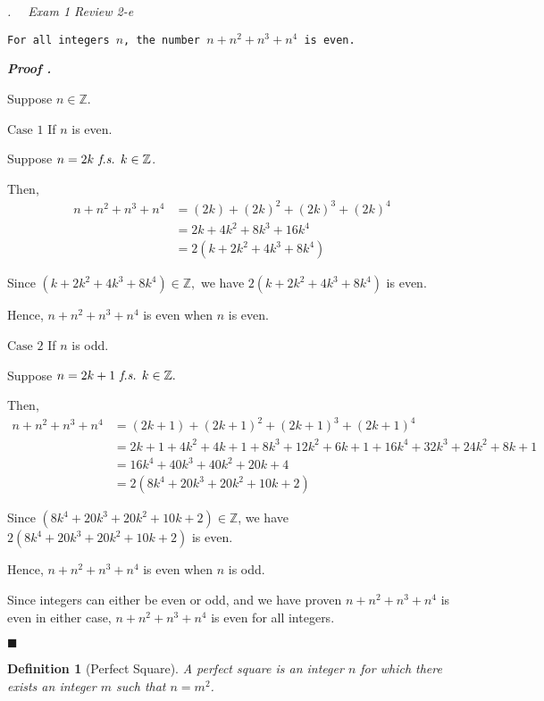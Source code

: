\documentclass[10pt,letter]{article}
\newcounter{nq}[section]
\newcounter{np}[section]
\newtheorem{df}{Definition}[section]
\newenvironment*{p}{\par\noindent\textbf{\textit{Proof \stepcounter{np}\thenp. }}\par}{\par\hfill $\blacksquare$\par}
\newenvironment*{q}[1]{\noindent\emph{\thesection.\stepcounter{nq}\thenq$\quad $ #1}\par\noindent\texttt}{}
\def\Z{{\mathbb{Z}}}
\def\fs{\emph{ f.s. }}
\begin{document}
\begin{framed}\begin{q}
	{Exam 1 Review 2-e}
	{For all integers $n$, the number $n+n^2+n^3+n^4$ is even.}
\end{q}\end{framed}
\begin{p}
	Suppose $n\in\Z$.\par$\boxed{\text{Case }1}$ If $n$ is even.\par\hspace{5mm}Suppose $n=2k\fs k\in\Z$.\par\hspace{5mm}Then,\[\begin{aligned}n+n^2+n^3+n^4&=(2k)+(2k)^2+(2k)^3+(2k)^4\\&=2k+4k^2+8k^3+16k^4\\&=2(k+2k^2+4k^3+8k^4)\end{aligned}\]\par\hspace{5mm}Since $(k+2k^2+4k^3+8k^4)\in\Z,$ we have $2(k+2k^2+4k^3+8k^4)$ is even.\par\hspace{5mm}Hence, $n+n^2+n^3+n^4$ is even when $n$ is even.\par$\boxed{\text{Case }2}$ If $n$ is odd.\par\hspace{5mm}Suppose $n=2k+1\fs k\in\Z.$\par\hspace{5mm}Then, \[\begin{aligned}n+n^2+n^3+n^4&=(2k+1)+(2k+1)^2+(2k+1)^3+(2k+1)^4\\&=2k+1+4k^2+4k+1+8k^3+12k^2+6k+1+16k^4+32k^3+24k^2+8k+1\\&=16k^4+40k^3+40k^2+20k+4\\&=2(8k^4+20k^3+20k^2+10k+2)\end{aligned}\]\par\hspace{5mm}Since $(8k^4+20k^3+20k^2+10k+2)\in\Z$, we have $2(8k^4+20k^3+20k^2+10k+2)$ is even.\par\hspace{5mm}Hence, $n+n^2+n^3+n^4$ is even when $n$ is odd.\par Since integers can either be even or odd, and we have proven $n+n^2+n^3+n^4$ is even in either case, $n+n^2+n^3+n^4$ is even for all integers. 
\end{p}

\begin{df}[Perfect Square]
A perfect square is an integer $n$ for which there exists an integer $m$ such that $n=m^2$. 
\end{df}
\end{document}
